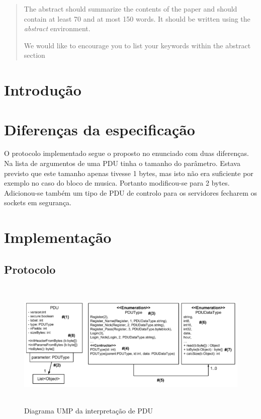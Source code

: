 \documentclass[runningheads,a4paper]{llncs}
\newcommand{\keywords}[1]{\par\addvspace\baselineskip
\noindent\keywordname\enspace\ignorespaces#1}
\begin{document}
\begin{abstract}
The abstract should summarize the contents of the paper and should
contain at least 70 and at most 150 words. It should be written using the
\emph{abstract} environment.
\keywords{We would like to encourage you to list your keywords within
the abstract section}
\end{abstract}


\section{Introdução}

\section{Diferenças da especificação}

O protocolo implementado segue o proposto no enunciado com duas diferenças.
Na lista de argumentos de uma PDU tinha o tamanho do parâmetro. Estava previsto que este tamanho apenas tivesse 1 bytes, mas isto não era suficiente por exemplo no caso do bloco de musica. Portanto modificou-se para 2 bytes.
Adicionou-se também um tipo de PDU de controlo para os servidores fecharem os sockets em segurança. 

\section{Implementação}

\subsection{Protocolo}


\begin{figure}
\centering
\includegraphics[height=6.2cm]{UDP.png}
\caption{Diagrama UMP da interpretação de PDU}
\label{fig:diagram-pdu}
\end{figure}
\end{document}
